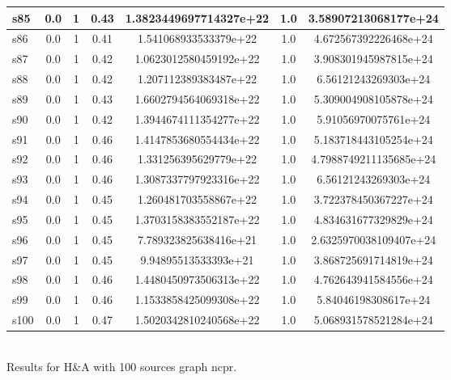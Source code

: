 \documentclass{article}
\begin{document}
\begin{tabular}{|l|c|c|c|c|c|c|}
s85 &0.0 & 1 & 0.43 & 1.3823449697714327e+22 & 1.0 & 3.58907213068177e+24\\
\hline
s86 &0.0 & 1 & 0.41 & 1.541068933533379e+22 & 1.0 & 4.672567392226468e+24\\
\hline
s87 &0.0 & 1 & 0.42 & 1.0623012580459192e+22 & 1.0 & 3.908301945987815e+24\\
\hline
s88 &0.0 & 1 & 0.42 & 1.207112389383487e+22 & 1.0 & 6.56121243269303e+24\\
\hline
s89 &0.0 & 1 & 0.43 & 1.6602794564069318e+22 & 1.0 & 5.309004908105878e+24\\
\hline
s90 &0.0 & 1 & 0.42 & 1.3944674111354277e+22 & 1.0 & 5.91056970075761e+24\\
\hline
s91 &0.0 & 1 & 0.46 & 1.4147853680554434e+22 & 1.0 & 5.183718443105254e+24\\
\hline
s92 &0.0 & 1 & 0.46 & 1.331256395629779e+22 & 1.0 & 4.7988749211135685e+24\\
\hline
s93 &0.0 & 1 & 0.46 & 1.3087337797923316e+22 & 1.0 & 6.56121243269303e+24\\
\hline
s94 &0.0 & 1 & 0.45 & 1.260481703558867e+22 & 1.0 & 3.722378450367227e+24\\
\hline
s95 &0.0 & 1 & 0.45 & 1.3703158383552187e+22 & 1.0 & 4.834631677329829e+24\\
\hline
s96 &0.0 & 1 & 0.45 & 7.789323825638416e+21 & 1.0 & 2.6325970038109407e+24\\
\hline
s97 &0.0 & 1 & 0.45 & 9.94895513533393e+21 & 1.0 & 3.868725691714819e+24\\
\hline
s98 &0.0 & 1 & 0.46 & 1.4480450973506313e+22 & 1.0 & 4.762643941584556e+24\\
\hline
s99 &0.0 & 1 & 0.46 & 1.1533858425099308e+22 & 1.0 & 5.84046198308617e+24\\
\hline
s100 &0.0 & 1 & 0.47 & 1.5020342810240568e+22 & 1.0 & 5.068931578521284e+24\\
\hline
\end{tabular}\\

\noindent Results for H\&A with 100 sources graph ncpr.
\end{document}
